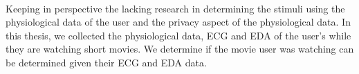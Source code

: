 \paragraph{} Keeping in perspective the lacking research in determining the stimuli using the physiological data of the user and the privacy aspect of the physiological data. In this thesis, we collected the physiological data, ECG and EDA of the user's while they are watching short movies. We determine if the movie user was watching can be determined given their ECG and EDA data. 


